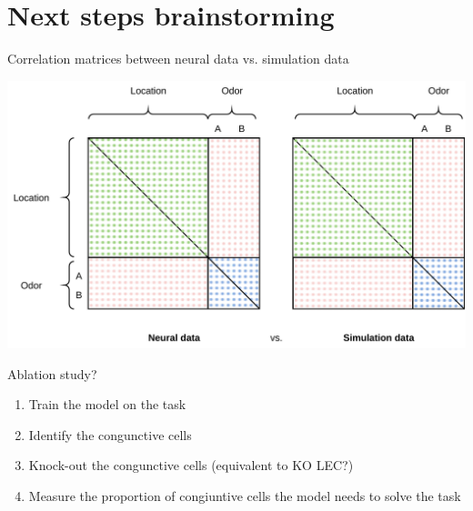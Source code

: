 \documentclass[bigger]{beamer}
\begin{document}
\section{Next steps brainstorming}
\label{sec:orgc678d15}
\begin{frame}[label={sec:org3498c40}]{Correlation matrices between neural data vs. simulation data}
\begin{center}
\includegraphics[width=.9\linewidth]{img/activation-matrix.drawio.pdf}
\end{center}
\end{frame}
\begin{frame}[label={sec:org67e8078}]{Ablation study?}
\begin{enumerate}
\item Train the model on the task
\item Identify the congunctive cells
\item Knock-out the congunctive cells (equivalent to KO LEC?)
\item Measure the proportion of congiuntive cells the model needs to solve the task
\end{enumerate}
\end{frame}
\end{document}
